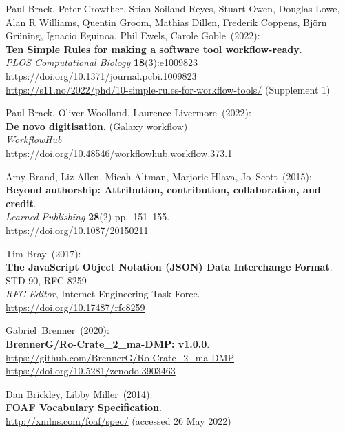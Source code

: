 \begin{thebibliography}{9}
Paul Brack, Peter Crowther, Stian Soiland-Reyes, Stuart Owen, Douglas Lowe, Alan R Williams, Quentin Groom, Mathias Dillen, Frederik Coppens, Björn Grüning, Ignacio Eguinoa, Phil Ewels, Carole Goble~(2022): \\
\textbf{Ten Simple Rules for making a software tool workflow-ready}.\\
\emph{PLOS Computational Biology} \textbf{18}(3):e1009823\\
\url{https://doi.org/10.1371/journal.pcbi.1009823}\\
\url{https://s11.no/2022/phd/10-simple-rules-for-workflow-tools/}
(Supplement 1)

Paul Brack, Oliver Woolland, Laurence Livermore~(2022): \\
\textbf{De novo digitisation.} (Galaxy workflow)\\
\emph{WorkflowHub}\\
\url{https://doi.org/10.48546/workflowhub.workflow.373.1}

Amy Brand, Liz Allen, Micah Altman, Marjorie Hlava, Jo~Scott~(2015): \\
\textbf{Beyond authorship: Attribution, contribution, collaboration, and credit}.\\
\emph{Learned Publishing} \textbf{28}(2) pp.~151--155.\\
\url{https://doi.org/10.1087/20150211}

Tim Bray~(2017): \\
\textbf{The JavaScript Object Notation (JSON) Data Interchange Format}.\\
STD 90, RFC 8259\\
\emph{RFC Editor}, 
Internet Engineering Task Force.\\
\url{https://doi.org/10.17487/rfc8259}

Gabriel~Brenner~(2020): \\
\textbf{BrennerG/Ro-Crate\_2\_ma-DMP: v1.0.0}.\\
\url{https://github.com/BrennerG/Ro-Crate_2_ma-DMP}\\
\url{https://doi.org/10.5281/zenodo.3903463}

Dan Brickley, Libby Miller~(2014): \\
\textbf{FOAF Vocabulary Specification}.\\
\url{http://xmlns.com/foaf/spec/} (accessed 26 May 2022)


\end{thebibliography}
